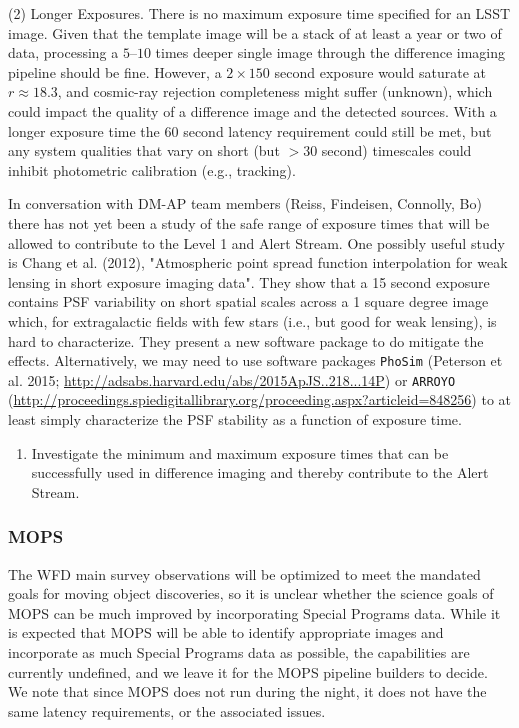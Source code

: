 \documentclass[DM,lsstdraft,toc]{lsstdoc}
\begin{document}
(2) Longer Exposures. There is no maximum exposure time specified for an LSST image. Given that the template image will be a stack of at least a year or two of data, processing a $5$--$10$ times deeper single image through the difference imaging pipeline should be fine. However, a $2\times150$ second exposure would saturate at $r \approx 18.3$, and cosmic-ray rejection completeness might suffer (unknown), which could impact the quality of a difference image and the detected sources. With a longer exposure time the $60$ second latency requirement could still be met, but any system qualities that vary on short (but $>30$ second) timescales could inhibit photometric calibration (e.g., tracking). 

In conversation with DM-AP team members (Reiss, Findeisen, Connolly, Bo) there has not yet been a study of the safe range of exposure times that will be allowed to contribute to the Level 1 and Alert Stream. One possibly useful study is Chang et al. (2012), "Atmospheric point spread function interpolation for weak lensing in short exposure imaging data". They show that a 15 second exposure contains PSF variability on short spatial scales across a 1 square degree image which, for extragalactic fields with few stars (i.e., but good for weak lensing), is hard to characterize. They present a new software package to do mitigate the effects. Alternatively, we may need to use software packages {\tt PhoSim} (Peterson et al. 2015; \url{http://adsabs.harvard.edu/abs/2015ApJS..218...14P}) or {\tt ARROYO} (\url{http://proceedings.spiedigitallibrary.org/proceeding.aspx?articleid=848256}) to at least simply characterize the PSF stability as a function of exposure time.

\begin{enumerate}[topsep=-10pt,label= \textbf{Action \Roman*.}] \item Investigate the minimum and maximum exposure times that can be successfully used in difference imaging and thereby contribute to the Alert Stream. \end{enumerate}

\subsubsection{MOPS}\label{ssec:dmdocs_SPinWFD_MOPS}

The WFD main survey observations will be optimized to meet the mandated goals for moving object discoveries, so it is unclear whether the science goals of MOPS can be much improved by incorporating Special Programs data. While it is expected that MOPS will be able to identify appropriate images and incorporate as much Special Programs data as possible, the capabilities are currently undefined, and we leave it for the MOPS pipeline builders to decide. We note that since MOPS does not run during the night, it does not have the same latency requirements, or the associated issues.
\end{document}

